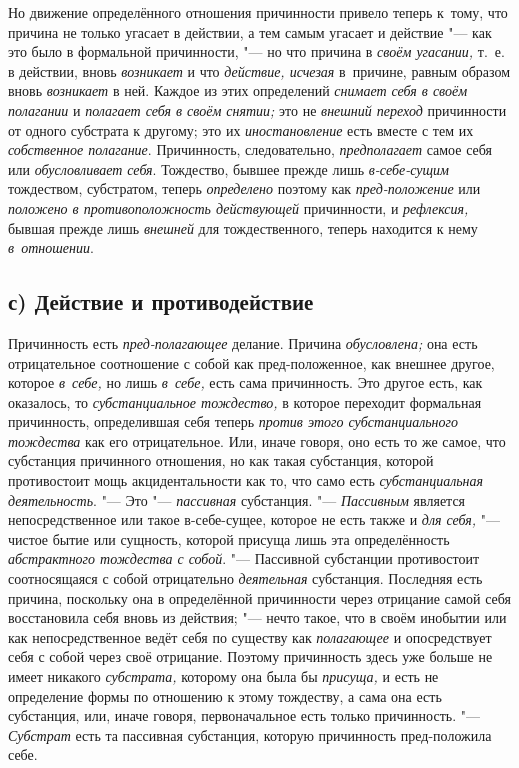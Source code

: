Но движение определённого отношения причинности привело теперь к~тому, что
причина не только угасает в действии, а тем самым угасает и действие "--- как
это было в формальной причинности, "--- но что причина в {\em своём угасании,}
т.~е. в действии, вновь {\em возникает} и что {\em действие, исчезая}
в~причине, равным образом вновь {\em возникает} в ней. Каждое из этих определений
{\em снимает себя в своём полагании} и {\em полагает себя в своём снятии;} это
не {\em внешний переход} причинности от одного субстрата к другому; это их
{\em иностановление} есть вместе с тем их {\em собственное полагание}.
Причинность, следовательно, {\em предполагает} самое себя или
{\em обусловливает себя}. Тождество, бывшее прежде лишь {\em в-себе-сущим}
тождеством, субстратом, теперь {\em определено} поэтому как
{\em пред-положение} или {\em положено в противоположность действующей}
причинности, и {\em рефлексия,} бывшая прежде лишь {\em внешней} для
тождественного, теперь находится к нему {\em в~отношении}.

\subsection[с) Действие и противодействие]{с) Действие и противодействие}

Причинность есть {\em пред-полагающее} делание. Причина {\em обусловлена;} она
есть отрицательное соотношение с собой как пред-положенное, как внешнее другое,
которое {\em в~себе,} но лишь {\em в~себе,} есть сама причинность. Это другое
есть, как оказалось, то {\em субстанциальное тождество,} в которое переходит
формальная причинность, определившая себя теперь {\em против этого
субстанциального тождества} как его отрицательное. Или, иначе говоря, оно есть
то же самое, что субстанция причинного отношения, но как такая субстанция,
которой противостоит мощь акцидентальности как то, что само есть
{\em субстанциальная деятельность}. "--- Это "--- {\em пассивная} субстанция.
"--- {\em Пассивным} является непосредственное или такое в-себе-сущее, которое
не есть также и {\em для себя,} "--- чистое бытие или сущность, которой присуща
лишь эта определённость {\em абстрактного тождества с собой}. "--- Пассивной
субстанции противостоит соотносящаяся с собой отрицательно {\em деятельная}
субстанция. Последняя есть причина, поскольку она в определённой причинности
через отрицание самой себя восстановила себя вновь из действия; "--- нечто
такое, что в своём инобытии или как непосредственное ведёт себя по существу как
{\em полагающее} и опосредствует себя с собой через своё отрицание. Поэтому
причинность здесь уже больше не имеет никакого {\em субстрата,} которому она
была бы {\em присуща,} и есть не определение формы по отношению к этому
тождеству, а сама она есть субстанция, или, иначе говоря, первоначальное есть
только причинность. "--- {\em Субстрат} есть та пассивная субстанция, которую
причинность пред-положила себе.

